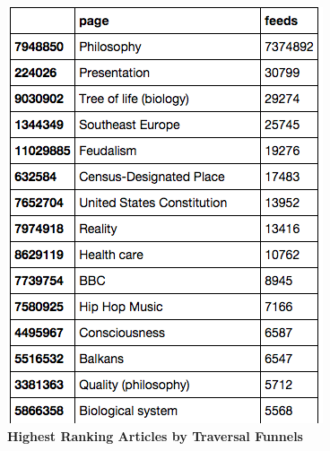 \documentclass[pre,twocolumn,twoside,superscriptaddress,floatfix, aps, 10pt]{revtex4-1}
\begin{document}
\begin{figure}[tp!]
  \centering	
  \includegraphics[width=\columnwidth]{graphics/top_funnels.png}
  \caption{
    \textbf{Highest Ranking Articles by Traversal Funnels}
  }
  \label{fig:Highest Ranking by Traversal Funnels}
\end{figure}
\end{document}
